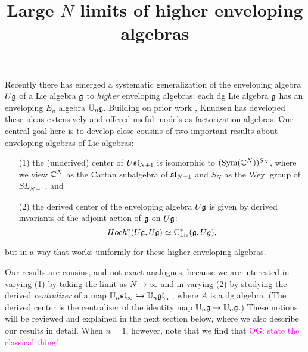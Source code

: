 \documentclass[11pt]{amsart}
\numberwithin{equation}{section}
\def\owen{\textcolor{magenta}{OG: }\textcolor{magenta}}
\begin{document}
\title{Large $N$ limits of higher enveloping algebras}

%


\maketitle
\thispagestyle{empty}

\tableofcontents
 
Recently there has emerged a systematic generalization of the enveloping algebra $U\fg$ of a Lie algebra $\fg$ to {\em higher} enveloping algebras:
each dg Lie algebra $\fg$ has an enveloping $E_n$ algebra $\UU_n\fg$.
Building on prior work \cite{BD, AF}, Knudsen \cite{Knudsen} has developed these ideas extensively and offered useful models as factorization algebras.
Our central goal here is to develop close cousins of two important results about enveloping algebras of Lie algebras: 
\begin{enumerate}
\item[(1)] the (underived) center of $U\sl_{N+1}$ is isomorphic to $(\Sym(\CC^{N}))^{S_N}$, where we view $\CC^{N}$ as the Cartan subalgebra of $\sl_{N+1}$ and $S_N$ as the Weyl group of $SL_{N+1}$, and
\item[(2)] the derived center of the enveloping algebra $U\fg$ is given by derived invariants of the adjoint action of $\fg$ on $U\fg$:
\[
Hoch^*(U\fg,U\fg) \simeq \clies(\fg, Ug),
\]
\end{enumerate}
but in a way that works uniformly for these higher enveloping algebras.

Our results are cousins, and not exact analogues, because we are interested in varying (1) by taking the limit as $N \to \infty$ and in varying (2) by studying the derived {\em centralizer} of a map $\UU_n\sl_\infty \hookrightarrow \UU_n\gl_\infty$, where $A$ is a dg algebra.
(The derived center is the centralizer of the identity map $\UU_n\fg \to \UU_n\fg$.)
These notions will be reviewed and explained in the next section below,
where we also describe our results in detail.
When $n=1$, however, note that we find that \owen{state the classical thing!}
\end{document}
